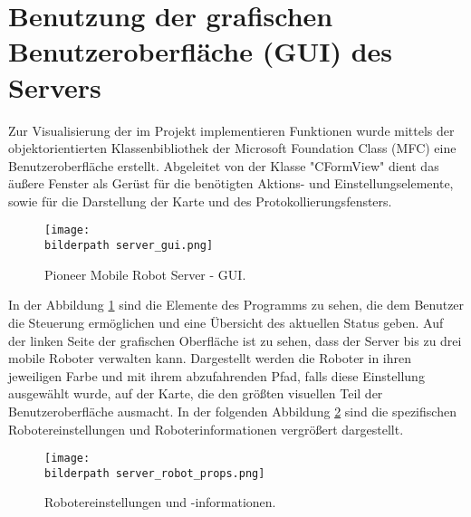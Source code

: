 \section{Benutzung der grafischen Benutzeroberfläche (GUI) des Servers} \label{serv:Gui}
Zur Visualisierung der im Projekt implementieren Funktionen wurde mittels der objektorientierten Klassenbibliothek der Microsoft Foundation Class (MFC) eine Benutzeroberfläche erstellt. Abgeleitet von der Klasse "CFormView" dient das äußere Fenster als Gerüst für die benötigten Aktions- und Einstellungselemente, sowie für die Darstellung der Karte und des Protokollierungsfensters. 

\begin{figure}[h]
		\centering
		\texttt{[image: \\bilderpath server\_gui.png]}
		\caption{Pioneer Mobile Robot Server - GUI.}
		\label{serv:fig:gui}
\end{figure}

In der Abbildung \ref{serv:fig:gui} sind die Elemente des Programms zu sehen,
die dem Benutzer die Steuerung ermöglichen und eine Übersicht des aktuellen
Status geben. Auf der linken Seite der grafischen Oberfläche ist zu sehen, dass
der Server bis zu drei mobile Roboter verwalten kann. Dargestellt werden die
Roboter in ihren jeweiligen Farbe und mit ihrem abzufahrenden Pfad, falls diese Einstellung ausgewählt wurde, auf der Karte, die den größten visuellen Teil der Benutzeroberfläche ausmacht. In der folgenden Abbildung \ref{serv:fig:props} sind die spezifischen Robotereinstellungen und Roboterinformationen vergrößert dargestellt.\\

\begin{figure}[h]
	\centering
	\texttt{[image: \\bilderpath server\_robot\_props.png]}
	\caption{Robotereinstellungen und -informationen.}
	\label{serv:fig:props}
\end{figure}


